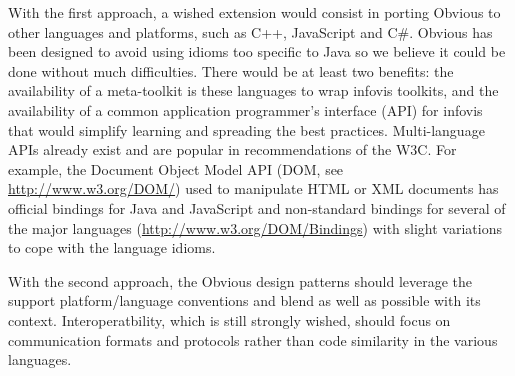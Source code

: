 With the first approach, a wished extension would consist in porting
Obvious to other languages and platforms, such as C++, JavaScript and
C\#.  Obvious has been designed to avoid using idioms too specific to
Java so we believe it could be done without much difficulties.  There
would be at least two benefits: the availability of a meta-toolkit is
these languages to wrap infovis toolkits, and the availability of a
common application programmer's interface (API) for infovis that would
simplify learning and spreading the best practices.  Multi-language
APIs already exist and are popular in recommendations of the W3C. For
example, the Document Object Model API (DOM, see
\url{http://www.w3.org/DOM/}) used to manipulate HTML or XML documents
has official bindings for Java and JavaScript and non-standard
bindings for several of the major languages
(\url{http://www.w3.org/DOM/Bindings}) with slight variations to cope
with the language idioms.

With the second approach, the Obvious design patterns should leverage
the support platform/language conventions and blend as well as
possible with its context. Interoperatbility, which is still strongly
wished, should focus on communication formats and protocols rather
than code similarity in the various languages.


\begin{comment}
This
endeavor raises some new challenges: each language and platforms
supposes some specific idioms that are hardly translatable in concepts
of the other languages. Java has a generic collection type, for
instance, that does not map to a standard equivalent in C++. In
translating the design verbatim from a language to another, we would
insure some level of compatibility, but at the expense of
idiosyncrasies in our library, which would preclude widespread
adoption in our target languages. Conversely, adopting the target
language's idioms would preclude interoperability of the Obvious
platform across languages.
\end{comment}

\begin{comment}

A true test of how generalizable and unifying Obvious would be
post-hoc integration of a new toolkit. IBM ILOG JViews~\cite{JViews}
is one such example being considered. Because it is a commercial
product, this would have the advantage of bringing considerable
exposure to the unification platform.
\end{comment}

